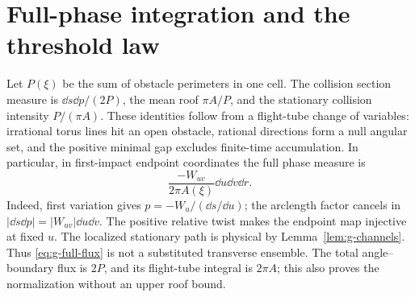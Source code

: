 \section{Full-phase integration and the threshold law}
\label{sec:g-integration}
Let $P(\xi)$ be the sum of obstacle perimeters in one cell. The collision section measure is
$\dd s\dd p/(2P)$, the mean roof $\pi A/P$, and the stationary collision
intensity $P/(\pi A)$. These identities follow from a flight-tube
change of variables: irrational torus lines hit an open
obstacle, rational directions form a null angular set, and the positive
minimal gap excludes finite-time accumulation. In particular, in
first-impact endpoint coordinates the full phase measure is
\begin{equation}\label{eq:g-full-flux}
             \frac{-W_{uv}}{2\pi A(\xi)}\dd u\dd v\dd r.
\end{equation}
Indeed, first variation gives $p=-W_u/(\dd s/\dd u)$; the arclength
factor cancels in $|\dd s\dd p|=|W_{uv}|\dd u\dd v$. The positive
relative twist makes the endpoint map injective at fixed $u$. The
localized stationary path is physical by Lemma~\ref{lem:g-channels}.
Thus \eqref{eq:g-full-flux} is not a substituted transverse ensemble.
The total angle--boundary flux is $2P$, and its flight-tube integral is
$2\pi A$; this also proves the normalization without an upper roof bound.

